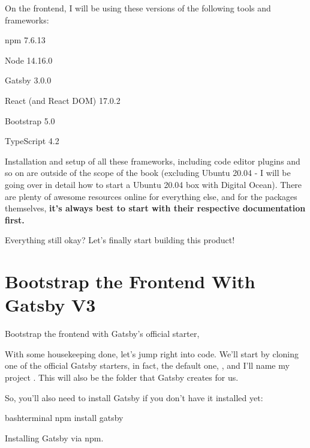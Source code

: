\documentclass[paper=6in:9in,pagesize=pdftex,headinclude=on,footinclude=on,12pt]{scrbook}
\begin{document}

On the frontend, I will be using these versions of the following tools and frameworks:

\begin{arrows}
\item npm 7.6.13
\item Node 14.16.0
\item Gatsby 3.0.0
\item React (and React DOM) 17.0.2
\item Bootstrap 5.0
\item TypeScript 4.2
\end{arrows}

Installation and setup of all these frameworks, including code editor plugins and so on are outside of the scope of the book (excluding Ubuntu 20.04 - I will be going over in detail how to start a Ubuntu 20.04 box with Digital Ocean). There are plenty of awesome resources online for everything else, and for the packages themselves, \textbf{it's always best to start with their respective documentation first.}

Everything still okay? Let's finally start building this product!

\section{Bootstrap the Frontend With Gatsby V3}
\begin{arrows}
\item Bootstrap the frontend with Gatsby's official starter, 
\end{arrows}

With some housekeeping done, let's jump right into code. We'll start by cloning one of the official Gatsby starters, in fact, the default one, , and I'll name my project . This will also be the folder that Gatsby creates for us. 

So, you'll also need to install Gatsby if you don't have it installed yet:

\begin{listing}[H]
\begin{code}{bash}{terminal}
npm install gatsby
\end{code}
\caption{Installing Gatsby via npm.}
\end{listing}
\end{document}
